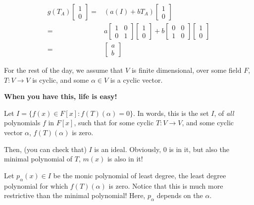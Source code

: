 \documentclass[12pt]{article}
\begin{document}
{    \begin{align*}
      g(T_A) \begin{bmatrix} 1 \\ 0 \end{bmatrix} =&(a(I) + b T_A)\begin{bmatrix} 1 \\ 0 \end{bmatrix} \\
                                                =&a\begin{bmatrix} 1 & 0 \\ 0 &
                                                  1 \end{bmatrix}\begin{bmatrix}
                                                  1 \\ 0 \end{bmatrix} + b
                                                  \begin{bmatrix} 0 & 0 \\ 1 & 0
                                                    \end{bmatrix}
                                                    \begin{bmatrix} 1 \\ 0
                                                    \end{bmatrix} \\
                                                =&\begin{bmatrix} a \\ b \end{bmatrix}
    \end{align*}
  }

  For the rest of the day, we assume that $V$ is finite dimensional, over some
  field $F$, $T: V \to V$ is cyclic, and some $\alpha \in V$ is a cyclic vector.

  {\bf When you have this, life is easy!}

  Let $I = \{f(x) \in F[x] : f(T)(\alpha) = 0\}$. In words, this is the set $I$,
  of {\it all} polynomials $f$ in $F[x]$, such that for some cyclic $T: V \to
  V$, and some cyclic vector $\alpha$, $f(T)(\alpha)$ is zero.

  Then, (you can check that) $I$ is an ideal. Obviously, $0$ is in it, but also
  the minimal polynomial of $T$, $m(x)$ is also in it!

  Let $p_\alpha(x) \in I$ be the monic polynomial of least degree, the least
  degree polynomial for which $f(T)(\alpha)$ is zero. Notice that this is much
  more restrictive than the minimal polynomial! Here, $p_\alpha$ depends on the
  $\alpha$.
\end{document}
